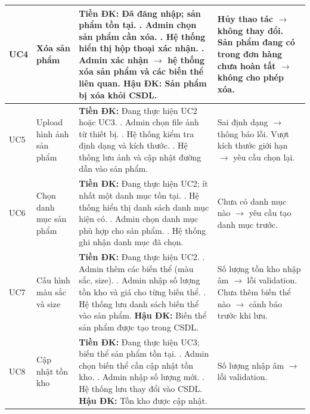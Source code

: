 \begin{longtable}{|>{\raggedright\arraybackslash}p{2cm}|>{\raggedright\arraybackslash}p{2.5cm}|>{\raggedright\arraybackslash}p{4cm}|>{\raggedright\arraybackslash}p{5.5cm}|}
UC4 & Xóa sản phẩm &
  \textbf{Tiền ĐK:} Đã đăng nhập; sản phẩm tồn tại. \newline
  1. Admin chọn sản phẩm cần xóa. \newline
  2. Hệ thống hiển thị hộp thoại xác nhận. \newline
  3. Admin xác nhận $\to$ hệ thống xóa sản phẩm và các biến thể liên quan. \newline
  \textbf{Hậu ĐK:} Sản phẩm bị xóa khỏi CSDL. &
  Hủy thao tác $\to$ không thay đổi. \newline
  Sản phẩm đang có trong đơn hàng chưa hoàn tất $\to$ không cho phép xóa. \\
\hline

UC5 & Upload hình ảnh sản phẩm &
  \textbf{Tiền ĐK:} Đang thực hiện UC2 hoặc UC3. \newline
  1. Admin chọn file ảnh từ thiết bị. \newline
  2. Hệ thống kiểm tra định dạng và kích thước. \newline
  3. Hệ thống lưu ảnh và cập nhật đường dẫn vào sản phẩm. &
  Sai định dạng $\to$ thông báo lỗi. \newline
  Vượt kích thước giới hạn $\to$ yêu cầu chọn lại. \\
\hline

UC6 & Chọn danh mục sản phẩm &
  \textbf{Tiền ĐK:} Đang thực hiện UC2; ít nhất một danh mục tồn tại. \newline
  1. Hệ thống hiển thị danh sách danh mục hiện có. \newline
  2. Admin chọn danh mục phù hợp cho sản phẩm. \newline
  3. Hệ thống ghi nhận danh mục đã chọn. &
  Chưa có danh mục nào $\to$ yêu cầu tạo danh mục trước. \\
\hline

UC7 & Cấu hình màu sắc và size &
  \textbf{Tiền ĐK:} Đang thực hiện UC2. \newline
  1. Admin thêm các biến thể (màu sắc, size). \newline
  2. Admin nhập số lượng tồn kho và giá cho từng biến thể. \newline
  3. Hệ thống lưu danh sách biến thể vào sản phẩm. \newline
  \textbf{Hậu ĐK:} Biến thể sản phẩm được tạo trong CSDL. &
  Số lượng tồn kho nhập âm $\to$ lỗi validation. \newline
  Chưa thêm biến thể nào $\to$ cảnh báo trước khi lưu. \\
\hline

UC8 & Cập nhật tồn kho &
  \textbf{Tiền ĐK:} Đang thực hiện UC3; biến thể sản phẩm tồn tại. \newline
  1. Admin chọn biến thể cần cập nhật tồn kho. \newline
  2. Admin nhập số lượng mới. \newline
  3. Hệ thống lưu thay đổi vào CSDL. \newline
  \textbf{Hậu ĐK:} Tồn kho được cập nhật. &
  Số lượng nhập âm $\to$ lỗi validation. \\
\hline


\end{longtable}
